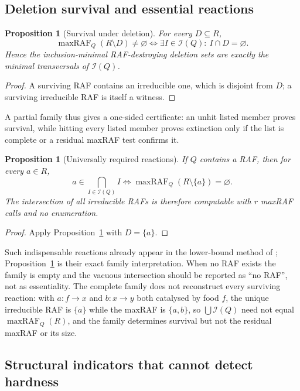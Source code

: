 \documentclass[11pt,a4paper]{article}
\theoremstyle{plain}
\newtheorem{proposition}[theorem]{Proposition}
\theoremstyle{definition}
\theoremstyle{remark}
\newcommand{\Irr}{\mathcal I}
\newcommand{\maxRAF}{\operatorname{maxRAF}}
\begin{document}
\subsection{Deletion survival and essential reactions}

\begin{proposition}[Survival under deletion]\label{prop:survival}
For every $D\subseteq R$,
\[
 \maxRAF_Q(R\setminus D)\neq\varnothing\iff\exists I\in\Irr(Q):\ I\cap D=\varnothing .
\]
Hence the inclusion-minimal RAF-destroying deletion sets are exactly the minimal transversals of $\Irr(Q)$.
\end{proposition}
\begin{proof}
A surviving RAF contains an irreducible one, which is disjoint from $D$; a surviving irreducible RAF is itself a witness.
\end{proof}

A partial family thus gives a one-sided certificate: an unhit listed member proves survival, while hitting every listed member proves extinction only if the list is complete or a residual maxRAF test confirms it.

\begin{proposition}[Universally required reactions]\label{prop:essential}
If $Q$ contains a RAF, then for every $a\in R$,
\[
 a\in\bigcap_{I\in\Irr(Q)}I\iff\maxRAF_Q(R\setminus\{a\})=\varnothing .
\]
The intersection of all irreducible RAFs is therefore computable with $r$ maxRAF calls and no enumeration.
\end{proposition}
\begin{proof}
Apply Proposition~\ref{prop:survival} with $D=\{a\}$.
\end{proof}

Such indispensable reactions already appear in the lower-bound method of \cite[Section~5]{steel2013minimal}; Proposition~\ref{prop:essential} is their exact family interpretation. When no RAF exists the family is empty and the vacuous intersection should be reported as ``no RAF'', not as essentiality. The complete family does not reconstruct every surviving reaction: with $a\colon f\to x$ and $b\colon x\to y$ both catalysed by food $f$, the unique irreducible RAF is $\{a\}$ while the maxRAF is $\{a,b\}$, so $\bigcup\Irr(Q)$ need not equal $\maxRAF_Q(R)$, and the family determines survival but not the residual maxRAF or its size.

\subsection{Structural indicators that cannot detect hardness}
\end{document}
